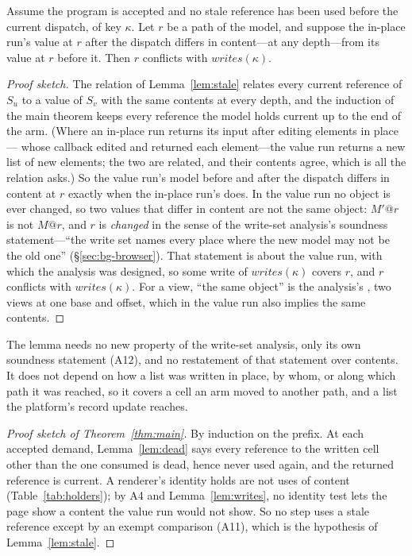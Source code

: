 \begin{lemma}
\label{lem:writes}
Assume the program is accepted and no stale reference has been used before the current dispatch, of key
$\kappa$. Let $r$ be a path of the model, and suppose the in-place run's value at $r$ after the dispatch
differs in content---at any depth---from its value at $r$ before it. Then $r$ conflicts with
$\mathit{writes}(\kappa)$.
\end{lemma}
\begin{proof}[Proof sketch]
The relation of Lemma~\ref{lem:stale} relates every current reference of $S_u$ to a value of $S_v$ with
the same contents at every depth, and the induction of the main theorem keeps every reference the model
holds current up to the end of the arm. (Where an in-place run returns its input after editing elements in
place--- whose callback edited and returned each element---the value run returns a new list of
new elements; the two are related, and their contents agree, which is all the relation asks.) So the
value run's model before and after the dispatch differs in content at $r$ exactly when the in-place run's
does. In the value run no object is ever changed, so two values that differ in content are not the same
object: $M'@r$ is not \code{===} $M@r$, and $r$ is \emph{changed} in the sense of the write-set analysis's
soundness statement---``the write set names every place where the new model may not be the old one''
(\S\ref{sec:bg-browser}). That statement is about the value run, with which the analysis was designed, so
some write of $\mathit{writes}(\kappa)$ covers $r$, and $r$ conflicts with $\mathit{writes}(\kappa)$. For a
view, ``the same object'' is the analysis's , two views at one base and offset, which in the
value run also implies the same contents.
\end{proof}
The lemma needs no new property of the write-set analysis, only its own soundness statement (A12), and no
restatement of that statement over contents. It
does not depend on how a list was written in place, by whom, or along which path it was reached, so it
covers a cell an arm moved to another path, and a list the platform's record update reaches.

\begin{proof}[Proof sketch of Theorem~\ref{thm:main}]
By induction on the prefix. At each accepted demand, Lemma~\ref{lem:dead} says every reference to the
written cell other than the one consumed is dead, hence never used again, and the returned reference is
current. A renderer's identity holds are not uses of content (Table~\ref{tab:holders}); by A4 and
Lemma~\ref{lem:writes}, no identity test lets the page show a content the value run would not show. So no
step uses a stale reference except by an exempt comparison (A11), which is the hypothesis of
Lemma~\ref{lem:stale}.
\end{proof}

